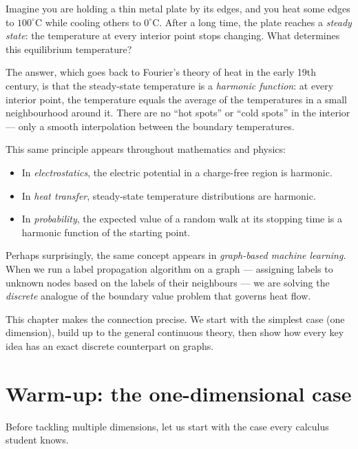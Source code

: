 \begin{notechapter}
Imagine you are holding a thin metal plate by its edges, and you heat some
edges to $100^\circ$C while cooling others to $0^\circ$C. After a long time,
the plate reaches a \emph{steady state}: the temperature at every interior
point stops changing. What determines this equilibrium temperature?

The answer, which goes back to Fourier's theory of heat in the early 19th century, is that the
steady-state temperature is a \emph{harmonic function}: at every interior
point, the temperature equals the average of the temperatures in a small
neighbourhood around it. There are no ``hot spots'' or ``cold spots'' in the
interior --- only a smooth interpolation between the boundary temperatures.

This same principle appears throughout mathematics and physics:
\begin{itemize}
    \item In \emph{electrostatics}, the electric potential in a charge-free
          region is harmonic.
    \item In \emph{heat transfer}, steady-state temperature distributions
          are harmonic.
    \item In \emph{probability}, the expected value of a random walk at its
          stopping time is a harmonic function of the starting point.
\end{itemize}

Perhaps surprisingly, the same concept appears in \emph{graph-based
machine learning}. When we run a label propagation algorithm on a
graph --- assigning labels to unknown nodes based on the labels of their
neighbours --- we are solving the \emph{discrete} analogue of the boundary
value problem that governs heat flow.

This chapter makes the connection precise. We start with the simplest
case (one dimension), build up to the general continuous theory, then show
how every key idea has an exact discrete counterpart on graphs.



\section{Warm-up: the one-dimensional case}
\label{harmonic-functions:sec:1d}

Before tackling multiple dimensions, let us start with the case every
calculus student knows.


\end{notechapter}
